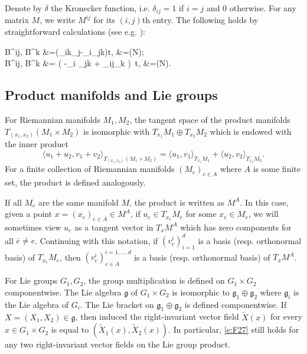 \documentclass[11pt,UTF-8,reqno]{amsart}
\numberwithin{equation}{section}
\def\u{\mathbf{u}}
\def\<{{\langle}}
\def\>{{\rangle}}
\def\dif{{\mathord{{\rm d}}}}
\def\u{\mathbf{u}}
\def\<{{\langle}}
\def\>{{\rangle}}
\def\dif{{\mathord{{\rm d}}}}
\def\so{\mathfrak{so}}
\def\su{\mathfrak{su}}
\def\u{\mathfrak{u}}
\def\mfg{\mathfrak{g}}
\def\<{\langle} \def\>{\rangle}
\begin{document}
Denote by $\delta$  the Kronecker function, i.e. $\delta_{ij}=1$ if $i=j$ and $0$ otherwise. For any matrix $M$, we write $M^{ij}$ for its $(i,j)$th entry.
%
The following holds by straightforward calculations (see e.g. \cite[(2.5)]{SSZloop}):
\begin{equs}[2]
	\dif\< B^{ij}, B^{k\ell}\>
	&=(\delta_{ik}\delta_{j\ell}-\delta_{i\ell}\delta_{jk})\dif t,
	&\qquad \mfg=\so(N);		\label{e:BB1}
	\\
	\dif\< B^{ij}, B^{k\ell}\>
	&= \big( -\delta_{i\ell} \delta_{jk} +  \delta_{ij}\delta_{k\ell} \big)\, \dif t\;,
	&\qquad\mfg=\su(N).				\label{e:BB3}
\end{equs}





\subsection{Product manifolds and Lie groups}
\label{sec:product}

For Riemannian manifolds $M_1, M_2$,
the tangent space of the product manifolds
$T_{(x_1,x_2)} (M_1 \times M_2)$ is isomorphic with $T_{x_1} M_1 \oplus T_{x_2} M_2$ which is endowed with
the inner product
$$\< u_1+u_2,v_1+v_2\>_{T_{(x_1,x_2)} (M_1 \times M_2)} = \< u_1,v_1\>_{T_{x_1} M_1}+\< u_2,v_2\>_{T_{x_2} M_2}.$$
For a finite collection of Riemannian manifolds $(M_e)_{e\in A}$ where $A$ is some finite set, 
the product is defined analogously.

If all $M_e$ are the same manifold $M$, the product is written as $M^{A}$.
In this case, given a point $x= (x_e)_{e\in A} \in M^A$,
 if $u_e \in T_{x_e} M_e$ for some $x_e \in M_e$,
we will sometimes view $u_e$ as a tangent vector in $T_x M^{A}$
which has zero components for all $\bar e \neq e$.
Continuing with this notation,
if $(v_e^i)_{i=1}^d$ is a basis (resp. orthonormal basis) of $T_{x_e} M_e$, then
 $(v_e^i)_{e\in A}^{i=1,...,d}$ is a basis (resp. orthonormal basis) of $T_{x} M^A$.


For Lie groups $G_1,G_2$, the group multiplication is defined on $G_1\times G_2$ componentwise.
The Lie algebra $\mfg$ of $G_1\times G_2$ is isomorphic to $\mfg_1 \oplus \mfg_2$ where $\mfg_i$ is the Lie algebra of $G_i$.
The Lie bracket on  $\mfg_1 \oplus \mfg_2$  is defined componentwise.
 If $X=(X_1,X_2) \in \mfg$,  then induced the right-invariant vector field
$\widetilde{X}(x)$ for every $x\in G_1\times G_2$
is equal to $(\widetilde X_1(x),\widetilde X_2(x))$. In particular,
\eqref{e:F27} still holds for any two right-invariant vector fields  on the  Lie group product.
\end{document}
